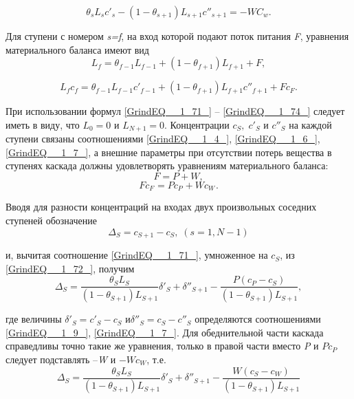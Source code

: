 \begin{equation} \label{GrindEQ__1_74_} 
  \theta _{s} L_{s} c'_{s} -(1-\theta _{s+1})L_{s+1} c''_{s+1} =-WC_{w}. 
\end{equation} 

Для ступени с номером \textit{s=f}, на вход которой подают поток питания \textit{F}, уравнения материального баланса имеют вид
\begin{equation} \label{GrindEQ__1_75_} 
L_{f} =\theta _{f-1} L_{f-1} +(1-\theta _{f+1} )L_{f+1} +F,     
\end{equation}

\begin{equation} \label{GrindEQ__1_76_}
  L_{f} c_{f} = \theta _{f-1} L_{f-1} c'_{f-1} + (1-\theta _{f+1})L_{f+1} c''_{f+1} +Fc_{F}.  
\end{equation}

При использовании формул \ref{GrindEQ__1_71_} -- \ref{GrindEQ__1_74_} следует иметь в виду, что $L_{0} =0$ и $L_{N+1} =0$. Концентрации $c_{S} ,\; c'_{S} $ и $c''_{S} $ на каждой ступени связаны соотношениями \ref{GrindEQ__1_4_}, \ref{GrindEQ__1_6_}, \ref{GrindEQ__1_7_}, а внешние параметры при отсутствии потерь вещества в ступенях каскада должны удовлетворять уравнениям материального баланса:
\begin{equation} \label{GrindEQ__1_77_} 
F=P+W,                                       
\end{equation} 
\begin{equation} \label{GrindEQ__1_78_} 
Fc_{F} {}^{} =Pc_{P} {}^{} +Wc_{W} {}^{} .                      
\end{equation} 

Вводя для разности концентраций на входах двух произвольных соседних  ступеней обозначение
\begin{equation} \label{GrindEQ__1_79_} 
\Delta _{S} =c_{S+1} -c_{S} ,\; (s=1,N-1) 
\end{equation} 

и, вычитая соотношение \ref{GrindEQ__1_71_}, умноженное на $c_{S} $, из \ref{GrindEQ__1_72_}, получим
\begin{equation} \label{GrindEQ__1_80_} 
\Delta _{S} =\frac{\theta _{S} L_{S} }{(1-\theta _{S+1} )L_{S+1} } \delta '_{S} +\delta ''_{S+1} -\frac{P(c_{P} -c_{S} )}{(1-\theta _{S+1} )L_{S+1} } ,            
\end{equation} 

где величины $\delta '_{S} =c'_{S} -c_{S} $ и$\delta ''_{S} =c_{S} -c''_{S} $ определяются соотношениями \ref{GrindEQ__1_9_}, \ref{GrindEQ__1_7_}. Для обеднительной части каскада справедливы точно такие же уравнения, только в правой части вместо \textit{P} и $Pc_{P} $ следует подставлять --\textit{W} и $-Wc_{W} $, т.е.
\begin{equation} \label{GrindEQ__1_81_} 
\Delta _{S} =\frac{\theta _{S} L_{S} }{(1-\theta _{S+1} )L_{S+1} } \delta '_{S} +\delta ''_{S+1} -\frac{W(c_{S} -c_{W} )}{(1-\theta _{S+1} )L_{S+1} }  
\end{equation} 

